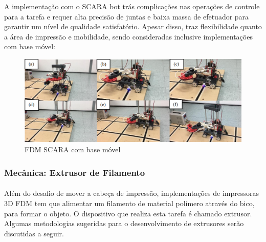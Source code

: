 \documentclass[12pt, english]{article}
\begin{document}
\begin{enumerate}[leftmargin=*, listparindent=0.7cm]
{		A implementação com o SCARA bot trás complicações nas operações de controle para a tarefa e requer alta precisão de juntas e baixa massa de efetuador para garantir um nível de qualidade satisfatório. Apesar disso, traz flexibilidade quanto a área de impressão e mobilidade, sendo consideradas inclusive implementações com base móvel: 

		\begin{figure}[H]
			\centering
			\includegraphics[height=.4\linewidth]{FDM-Scara-Mobile.png}
			\caption{FDM SCARA com base móvel}
		\end{figure} 

	}
\end{enumerate}

\subsubsection{Mecânica: Extrusor de Filamento}

\paragraph{}
Além do desafio de mover a cabeça de impressão, implementações de impressoras 3D FDM tem que alimentar um filamento de material polímero através do bico, para formar o objeto. O dispositivo que realiza esta tarefa é chamado extrusor. Algumas metodologias sugeridas para o desenvolvimento de extrusores serão discutidas a seguir.
\end{document}
